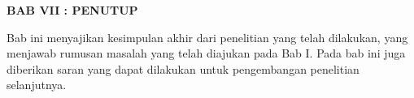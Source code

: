 \noindent
\textbf{BAB VII : PENUTUP}

Bab ini menyajikan kesimpulan akhir dari penelitian yang telah dilakukan, yang
menjawab rumusan masalah yang telah diajukan pada Bab I. 
Pada bab ini juga diberikan saran yang dapat dilakukan untuk pengembangan penelitian selanjutnya.\\

